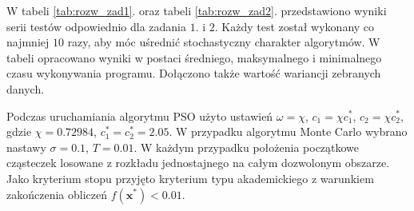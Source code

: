 \documentclass[11pt, a4paper, oneside]{article}
\newcommand{\vect}[1]{\bm{\mathbf{#1}}}
\begin{document}
W tabeli \ref{tab:rozw_zad1}. oraz tabeli \ref{tab:rozw_zad2}. przedstawiono wyniki serii testów odpowiednio dla zadania $1$. i $2$. Każdy test został wykonany co najmniej $10$ razy, aby móc uśrednić stochastyczny charakter algorytmów. W tabeli opracowano wyniki w postaci średniego, maksymalnego i minimalnego czasu wykonywania programu. Dołączono także wartość wariancji zebranych danych.

Podczas uruchamiania algorytmu PSO użyto ustawień $\omega = \chi$, $c_1 = \chi c_1^*$, $c_2 = \chi c_2^*$, gdzie $\chi = 0.72984$, $c_1^* = c_2^* = 2.05$. W przypadku algorytmu Monte Carlo wybrano nastawy $\sigma = 0.1$, $T = 0.01$. W każdym przypadku położenia początkowe cząsteczek losowane z rozkładu jednostajnego na całym dozwolonym obszarze. Jako kryterium stopu przyjęto kryterium typu akademickiego z warunkiem zakończenia obliczeń $f\left(\vect{x}^{*}\right) < 0.01$.
\end{document}
